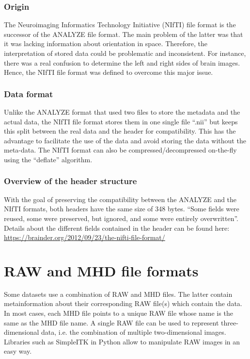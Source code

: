 \subsubsection{Origin}
The Neuroimaging Informatics Technology Initiative (NIfTI) file format is the successor of the ANALYZE file format. The main problem of the latter was that it was lacking information about orientation in space. Therefore, the interpretation of stored data could be problematic and inconsistent. For instance, there was a real confusion to determine the left and right sides of brain images. Hence, the NIfTI file format was defined to overcome this major issue.


\subsubsection{Data format}
Unlike the ANALYZE format that used two files to store the metadata and the actual data, the NIfTI file format stores them in one single file “.nii” but keeps this split between the real data and the header for compatibility. This has the advantage to facilitate the use of the data and avoid storing the data without the meta-data. The NIfTI format can also be compressed/decompressed on-the-fly using the “deflate”  algorithm.


\subsubsection{Overview of the header structure}
With the goal of preserving the compatibility between the ANALYZE and the NIfTI formats, both headers have the same size of 348 bytes. “Some fields were reused, some were preserved, but ignored, and some were entirely overwritten”. Details about the different fields contained in the header can be found here: \url{https://brainder.org/2012/09/23/the-nifti-file-format/}


\section{RAW and MHD file formats}

Some datasets use a combination of RAW and MHD files. The latter contain metainformation about their corresponding RAW file(s) which contain the data. In most cases, each MHD file points to a unique RAW file whose name is the same as the MHD file name. A single RAW file can be used to represent three-dimensional data, i.e. the combination of multiple two-dimensional images. Libraries such as \mbox{SimpleITK} in Python allow to manipulate RAW images in an easy way. 


